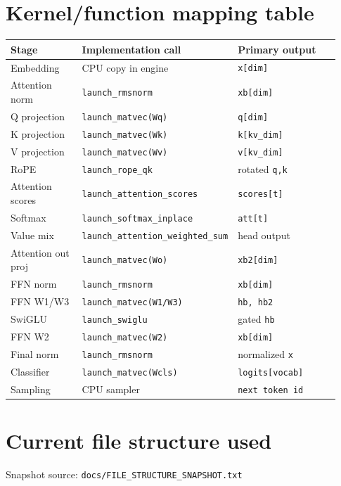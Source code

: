 \documentclass[11pt]{article}
\begin{document}
\section{Kernel/function mapping table}
\begin{longtable}{p{0.24\linewidth} p{0.33\linewidth} p{0.36\linewidth}}
\toprule
\textbf{Stage} & \textbf{Implementation call} & \textbf{Primary output} \\
\midrule
\endhead
Embedding & CPU copy in engine & \texttt{x[dim]} \\
Attention norm & \texttt{launch\_rmsnorm} & \texttt{xb[dim]} \\
Q projection & \texttt{launch\_matvec(Wq)} & \texttt{q[dim]} \\
K projection & \texttt{launch\_matvec(Wk)} & \texttt{k[kv\_dim]} \\
V projection & \texttt{launch\_matvec(Wv)} & \texttt{v[kv\_dim]} \\
RoPE & \texttt{launch\_rope\_qk} & rotated \texttt{q,k} \\
Attention scores & \texttt{launch\_attention\_scores} & \texttt{scores[t]} \\
Softmax & \texttt{launch\_softmax\_inplace} & \texttt{att[t]} \\
Value mix & \texttt{launch\_attention\_weighted\_sum} & head output \\
Attention out proj & \texttt{launch\_matvec(Wo)} & \texttt{xb2[dim]} \\
FFN norm & \texttt{launch\_rmsnorm} & \texttt{xb[dim]} \\
FFN W1/W3 & \texttt{launch\_matvec(W1/W3)} & \texttt{hb, hb2} \\
SwiGLU & \texttt{launch\_swiglu} & gated \texttt{hb} \\
FFN W2 & \texttt{launch\_matvec(W2)} & \texttt{xb[dim]} \\
Final norm & \texttt{launch\_rmsnorm} & normalized \texttt{x} \\
Classifier & \texttt{launch\_matvec(Wcls)} & \texttt{logits[vocab]} \\
Sampling & CPU sampler & \texttt{next token id} \\
\bottomrule
\end{longtable}

\section{Current file structure used}
Snapshot source:
\texttt{docs/FILE\_STRUCTURE\_SNAPSHOT.txt}
\end{document}
